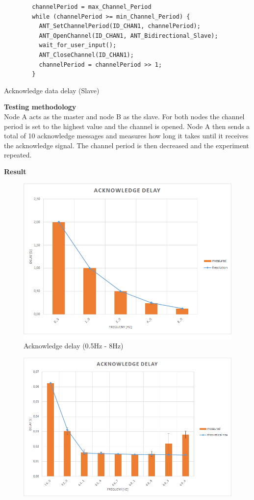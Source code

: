 \begin{description}
	\begin{code}[H]
		\begin{verbatim}
		channelPeriod = max_Channel_Period
		while (channelPeriod >= min_Channel_Period) {
		  ANT_SetChannelPeriod(ID_CHAN1, channelPeriod);
		  ANT_OpenChannel(ID_CHAN1, ANT_Bidirectional_Slave);				 
		  wait_for_user_input();
		  ANT_CloseChannel(ID_CHAN1);
		  channelPeriod = channelPeriod >> 1;
		}
		\end{verbatim}
		\caption{Acknowledge data delay (Slave)}\label{lst:sExp3}
	\end{code}
	
	\item{\textbf{Testing methodology}} \hfill \\ Node A acts as the master and node B as the slave. For both nodes the channel period is set to the highest value and the channel is opened. Node A then sends a total of 10 acknowledge messages and measures how long it takes until it receives the acknowledge signal. The channel period is then decreased and the experiment repeated.
	\item{\textbf{Result}} \hfill \\  
	\begin{figure}[H]
		\centering
		\includegraphics[scale=0.5]{./pics/exp3_norm.png}
		\caption{Acknowledge delay (0.5Hz - 8Hz)}\label{fig:exp3low}
	\end{figure}
	\begin{figure}[H]
		\centering
		\includegraphics[scale=0.5]{./pics/exp3_detail.png}

\end{figure}
\end{description}
